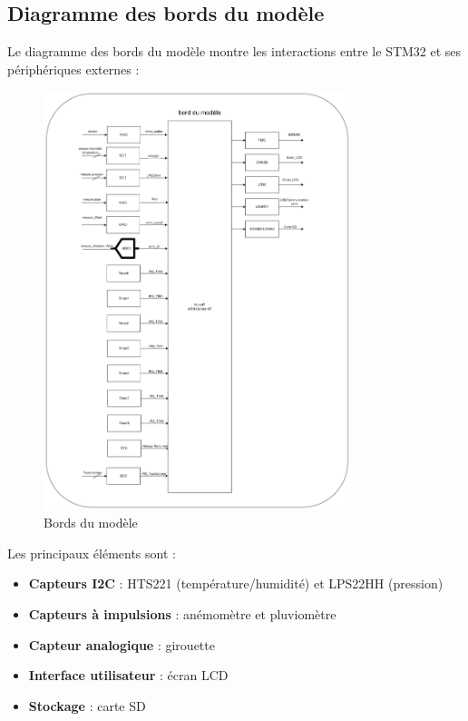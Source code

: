 \documentclass[12pt]{article}
\begin{document}
\subsection{Diagramme des bords du modèle}
Le diagramme des bords du modèle montre les interactions entre le STM32 et ses périphériques externes :

\begin{figure}[H]
    \capstart
    \centering
    \includegraphics[width=0.8\textwidth]{./images/bords_du_modele1.png}
    \caption{Bords du modèle}
    \label{fig:bords}
\end{figure}

Les principaux éléments sont :
\begin{itemize}
    \item \textbf{Capteurs I2C} : HTS221 (température/humidité) et LPS22HH (pression)
    \item \textbf{Capteurs à impulsions} : anémomètre et pluviomètre
    \item \textbf{Capteur analogique} : girouette
    \item \textbf{Interface utilisateur} : écran LCD
    \item \textbf{Stockage} : carte SD
\end{itemize}
\end{document}

